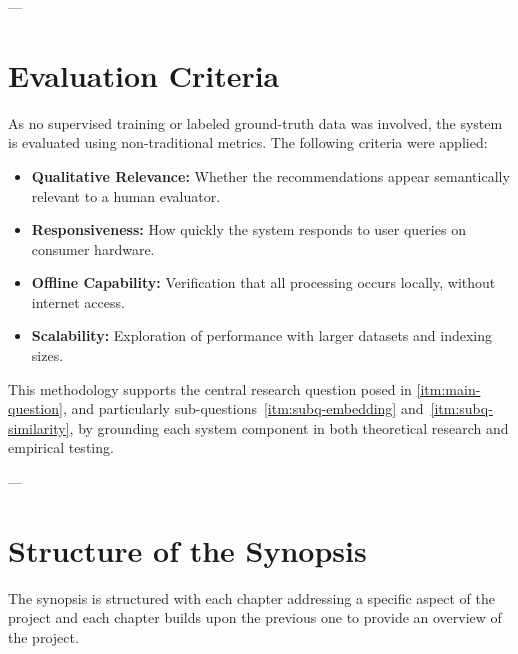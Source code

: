 ---

\section{Evaluation Criteria}
\label{sec:evaluation-criteria}

As no supervised training or labeled ground-truth data was involved, the system is evaluated using non-traditional metrics. The following criteria were applied:

\begin{itemize}
    \item \textbf{Qualitative Relevance:} Whether the recommendations appear semantically relevant to a human evaluator.
    \item \textbf{Responsiveness:} How quickly the system responds to user queries on consumer hardware.
    \item \textbf{Offline Capability:} Verification that all processing occurs locally, without internet access.
    \item \textbf{Scalability:} Exploration of performance with larger datasets and indexing sizes.
\end{itemize}

This methodology supports the central research question posed in \autoref{itm:main-question}, and particularly sub-questions~\ref{itm:subq-embedding} and~\ref{itm:subq-similarity}, by grounding each system component in both theoretical research and empirical testing.

---

\section{Structure of the Synopsis}
\label{sec:structure-synopsis}
The synopsis is structured with each chapter addressing a specific aspect of the project and each chapter builds upon the previous one to provide an overview of the project.
